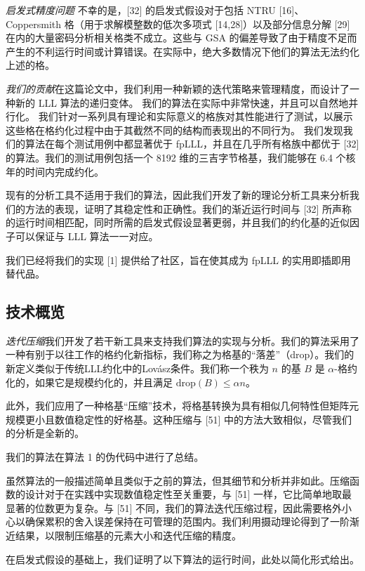 \documentclass[UTF8]{ctexart}
\begin{document}
{\emph {启发式精度问题}\quad} 不幸的是，[32] 的启发式假设对于包括 NTRU [16]、Coppersmith 格（用于求解模整数的低次多项式 [14,28]）以及部分信息分解 [29] 在内的大量密码分析相关格类不成立。这些与 GSA 的偏差导致了由于精度不足而产生的不利运行时间或计算错误。在实际中，绝大多数情况下他们的算法无法约化上述的格。


\emph{我们的贡献}\quad 在这篇论文中，我们利用一种新颖的迭代策略来管理精度，而设计了一种新的 LLL 算法的递归变体。
我们的算法在实际中非常快速，并且可以自然地并行化。
我们针对一系列具有理论和实际意义的格族对其性能进行了测试，以展示这些格在格约化过程中由于其截然不同的结构而表现出的不同行为。
我们发现我们的算法在每个测试用例中都显著优于 fpLLL，并且在几乎所有格族中都优于 [32] 的算法。我们的测试用例包括一个 8192 维的三吉字节格基，我们能够在 6.4 个核年的时间内完成约化。

现有的分析工具不适用于我们的算法，因此我们开发了新的理论分析工具来分析我们的方法的表现，证明了其稳定性和正确性。我们的渐近运行时间与 [32] 所声称的运行时间相匹配，同时所需的启发式假设显著更弱，并且我们的约化基的近似因子可以保证与 LLL 算法一一对应。

我们已经将我们的实现 [1] 提供给了社区，旨在使其成为 fpLLL 的实用即插即用替代品。

    \subsection{技术概览}

    \emph{迭代压缩}\quad 我们开发了若干新工具来支持我们算法的实现与分析。我们的算法采用了一种有别于以往工作的格约化新指标，我们称之为格基的“落差”（drop）。我们的新定义类似于传统LLL约化中的Lovász条件。我们称一个秩为 \(n\) 的基 \(B\) 是 \(\alpha\)-格约化的，如果它是规模约化的，并且满足 \(\text{drop}(B) \leq \alpha n\)。

    此外，我们应用了一种格基“压缩”技术，将格基转换为具有相似几何特性但矩阵元规模更小且数值稳定性的好格基。这种压缩与 [51] 中的方法大致相似，尽管我们的分析是全新的。

    我们的算法在算法 1 的伪代码中进行了总结。


    虽然算法的一般描述简单且类似于之前的算法，但其细节和分析并非如此。压缩函数的设计对于在实践中实现数值稳定性至关重要，与 [51] 一样，它比简单地取最显著的位数更为复杂。与 [51] 不同，我们的算法迭代压缩过程，因此需要格外小心以确保累积的舍入误差保持在可管理的范围内。我们利用摄动理论得到了一阶渐近结果，以限制压缩基的元素大小和迭代压缩的精度。

    在启发式假设的基础上，我们证明了以下算法的运行时间，此处以简化形式给出。
    
\end{document}
